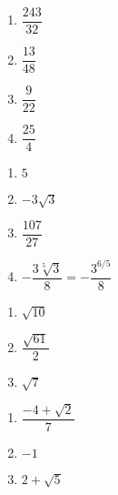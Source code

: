 \begin{multicols}{4}
\begin{enumerate}
\setcounter{enumi}{\value{HW}}

\item  $\dfrac{243}{32}$
\item  $\dfrac{13}{48}$
\item  $\dfrac{9}{22}$
\item  $\dfrac{25}{4}$

\setcounter{HW}{\value{enumi}}
\end{enumerate}
\end{multicols}

\begin{multicols}{4}
\begin{enumerate}
\setcounter{enumi}{\value{HW}}

\item  $5$ 
\item  $-3\sqrt{3}$ 
\item  $\dfrac{107}{27}$
\item  $-\dfrac{3\sqrt[5]{3}}{8} = -\dfrac{3^{6/5}}{8}$

\setcounter{HW}{\value{enumi}}
\end{enumerate}
\end{multicols}


\begin{multicols}{3}
\begin{enumerate}
\setcounter{enumi}{\value{HW}}

\item  $\sqrt{10}$
\item  $\dfrac{\sqrt{61}}{2}$ 
\item  $\sqrt{7}$

\setcounter{HW}{\value{enumi}}
\end{enumerate}
\end{multicols}

\begin{multicols}{3}
\begin{enumerate}
\setcounter{enumi}{\value{HW}}

\item  $\dfrac{-4 + \sqrt{2}}{7}$
\item  $-1$
\item  $2 + \sqrt{5}$

\setcounter{HW}{\value{enumi}}
\end{enumerate}
\end{multicols}

